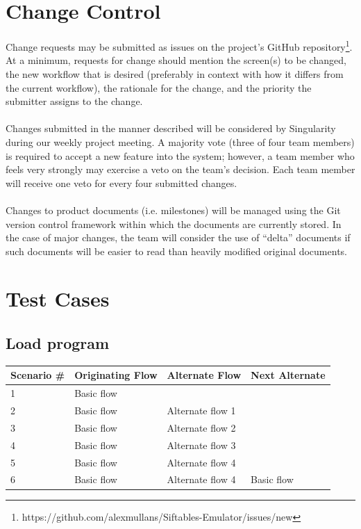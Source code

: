 \documentclass[12pt]{article}
\begin{document}
\section{Change Control}
Change requests may be submitted as issues on the project's GitHub repository\footnote{https://github.com/alexmullans/Siftables-Emulator/issues/new}. At a minimum, requests for change should mention the screen(s) to be changed, the new workflow that is desired (preferably in context with how it differs from the current workflow), the rationale for the change, and the priority the submitter assigns to the change. \\\\
Changes submitted in the manner described will be considered by Singularity during our weekly project meeting. A majority vote (three of four team members) is required to accept a new feature into the system; however, a team member who feels very strongly may exercise a veto on the team's decision. Each team member will receive one veto for every four submitted changes. \\\\
Changes to product documents (i.e. milestones) will be managed using the Git version control framework within which the documents are currently stored. In the case of major changes, the team will consider the use of ``delta'' documents if such documents will be easier to read than heavily modified original documents.

\clearpage
\section{Test Cases}

\subsection{Load program}

\begin{table}[h!]
  \begin{tabular}{l | l | l | l}
    \textbf{Scenario \#} &
    \textbf{Originating Flow} &
    \textbf{Alternate Flow} &
    \textbf{Next Alternate} \\ \hline

    1 &
    Basic flow &
    &
    \\ \hline

    2 &
    Basic flow &
    Alternate flow 1 &
    \\ \hline

    3 &
    Basic flow &
    Alternate flow 2 &
    \\ \hline

    4 &
    Basic flow &
    Alternate flow 3 &
    \\ \hline

    5 &
    Basic flow &
    Alternate flow 4 &
    \\ \hline

    6 &
    Basic flow &
    Alternate flow 4 &
    Basic flow \\ \hline

  \end{tabular}
\end{table}
\end{document}
